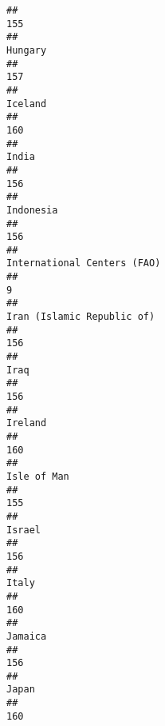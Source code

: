 \documentclass[]{article}
\begin{document}
\begin{verbatim}
##                                                                                          155 
##                                                                                      Hungary 
##                                                                                          157 
##                                                                                      Iceland 
##                                                                                          160 
##                                                                                        India 
##                                                                                          156 
##                                                                                    Indonesia 
##                                                                                          156 
##                                                                  International Centers (FAO) 
##                                                                                            9 
##                                                                   Iran (Islamic Republic of) 
##                                                                                          156 
##                                                                                         Iraq 
##                                                                                          156 
##                                                                                      Ireland 
##                                                                                          160 
##                                                                                  Isle of Man 
##                                                                                          155 
##                                                                                       Israel 
##                                                                                          156 
##                                                                                        Italy 
##                                                                                          160 
##                                                                                      Jamaica 
##                                                                                          156 
##                                                                                        Japan 
##                                                                                          160 

\end{verbatim}
\end{document}
